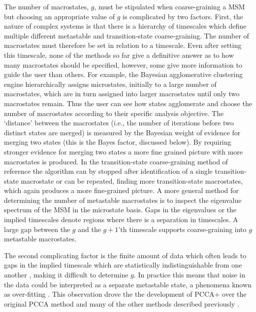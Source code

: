 The number of macrostates, $g$, must be stipulated when coarse-graining a MSM but choosing an appropriate value of $g$ is complicated by two factors. First, the nature of complex systems is that there is a hierarchy of timescales \cite{frauenfelderEnergyLandscapesMotions1991, henzler-wildmanDynamicPersonalitiesProteins2007} which define multiple different metastable and transition-state coarse-graining. The number of macrostates must therefore be set in relation to a timescale. Even after setting this timescale, none of the methods so far give a definitive answer as to how many macrostates should be specified, however, some give more information to guide the user than others. For example, the Bayesian agglomerative clustering engine \cite{bowmanImprovedCoarsegrainingMarkov2012a} hierarchically assigns microstates, initially to a large number of  macrostates, which are in turn assigned into larger macrostates until only two macrostates remain. Thus the user can see how states agglomerate and choose the number of macrostates according to their specific analysis objective. The `distance' between the macrostates (i.e., the number of iterations before two distinct states are merged) is measured by the Bayesian weight of evidence for merging two states (this is the Bayes factor, discussed below).  By requiring stronger evidence for merging two states a more fine grained picture with more macrostates is produced.  In the transition-state coarse-graining method of reference \cite{martiniVariationalIdentificationMarkovian2017} the algorithm can by stopped after identification of a single transition-state macrostate or can be repeated, finding more transition-state macrostates, which again produces a more fine-grained picture.  A more general method for determining the number of metastable macrostates is to inspect the eigenvalue spectrum of the MSM in the microstate basis.  Gaps in the eigenvalues or the implied timescales \cite{noeProjectedHiddenMarkov2013a} denote regions where there is a separation in timescales. A large gap between the $g$ and the $g+1$'th timescale supports coarse-graining into $g$ metastable macrostates. 

The second complicating factor is the finite amount of data which often leads to gaps in the implied timescale which are statistically indistinguishable from one another \cite{bowmanQuantitativeComparisonAlternative2013}, making it difficult to determine $g$.  In practice this means that noise in the data could be interpreted as a separate metastable state, a phenomena known as over-fitting \cite[chapter 6]{friedman2001elements}. This observation drove the the development of PCCA+ over the original PCCA method \cite{deuflhardRobustPerronCluster2005b} and many of the other methods described previously \cite{bowmanQuantitativeComparisonAlternative2013}.  

